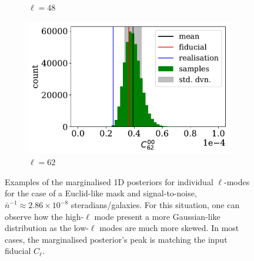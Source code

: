 \begin{figure}
\begin{subfigure}{.5\textwidth}
  \caption{$\ell = 48$}
\end{subfigure}
\begin{subfigure}{.5\textwidth}
  \centering
  \includegraphics[width=\textwidth]{BPL-FIGS/Euclid-LN-PNoi-N32-HDens_HISTOGRAM-ell-62.pdf}
  \caption{$\ell = 62$}
\end{subfigure}
\caption[Examples of marginalised 1D posteriors for individual $\ell$-modes for the case of a Euclid-like mask and signal-to-noise.]{Examples of the marginalised 1D posteriors for individual $\ell$-modes for the case of a Euclid-like mask and signal-to-noise, $\bar{n}^{-1}\approx 2.86\times 10^{-8}$ steradians/galaxies. For this situation, one can observe how the high-$\ell$ mode present a more Gaussian-like distribution as the low-$\ell$ modes are much more skewed. In most cases, the marginalised posterior's peak is matching the input fiducial $C_{\ell}$.}
\label{fig:BPL:Euclid-Ells-HighSN}
\end{figure}






